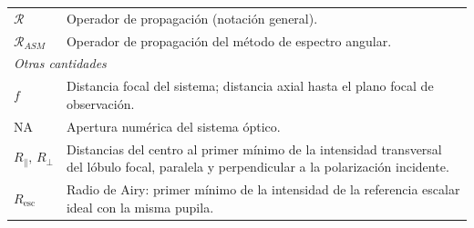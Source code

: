 \begin{longtable}{p{} p{}}
$\mathscr R$ & Operador de propagación (notación general). \\
$\mathscr R_{ASM}$ & Operador de propagación del método de espectro angular. \\
\hline
\multicolumn{2}{l}{\textit{Otras cantidades}} \\
\hline
$f$ & Distancia focal del sistema; distancia axial hasta el plano focal de observación. \\
$\mathrm{NA}$ & Apertura numérica del sistema óptico. \\
$R_\parallel,\,R_\perp$ & Distancias del centro al primer mínimo de la intensidad transversal del lóbulo focal, paralela y perpendicular a la polarización incidente. \\
$R_{\mathrm{esc}}$ & Radio de Airy: primer mínimo de la intensidad de la referencia escalar ideal con la misma pupila. \\
\end{longtable}

